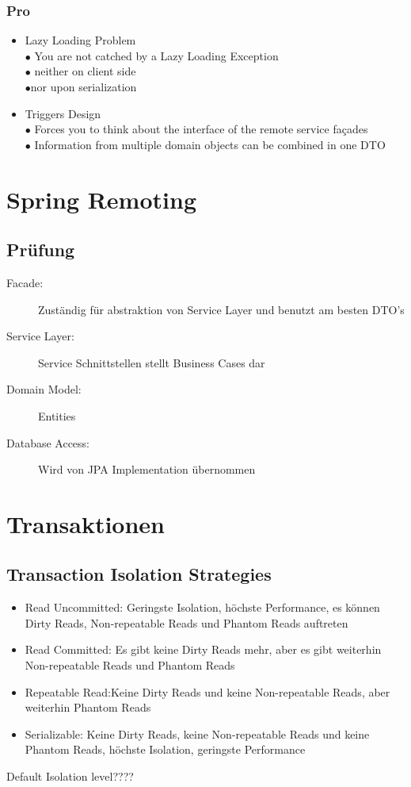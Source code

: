 \documentclass[10pt]{scrartcl}
\begin{document}
\subsubsection{Pro}
\begin{itemize}
\item Lazy Loading Problem\\
$\bullet$ You are not catched by a Lazy Loading Exception\\
\hspace*{0.5cm}$\bullet$ neither on client side\\
\hspace*{0.5cm}$\bullet$nor upon serialization
\item Triggers Design\\
$\bullet$ Forces you to think about the interface of the remote service façades\\
$\bullet$ Information from multiple domain objects can be combined in one DTO
\end{itemize}

\newpage
\section{Spring Remoting}
\subsection{Prüfung}
\begin{description}
\item[Facade:] Zuständig für abstraktion von Service Layer und benutzt am besten DTO's
\item[Service Layer:] Service Schnittstellen stellt Business Cases dar
\item[Domain Model:] Entities
\item[Database Access:] Wird von JPA Implementation übernommen
\end{description}

\newpage
\section{Transaktionen}
\subsection{Transaction Isolation Strategies}
\begin{itemize}
	\item Read Uncommitted: Geringste Isolation, höchste Performance, es können Dirty Reads, Non-repeatable Reads und Phantom Reads auftreten
	\item Read Committed: Es gibt keine Dirty Reads mehr, aber es gibt weiterhin Non-repeatable Reads und Phantom Reads
	\item Repeatable Read:Keine Dirty Reads und keine Non-repeatable Reads, aber weiterhin Phantom Reads
	\item Serializable: Keine Dirty Reads, keine Non-repeatable Reads und keine Phantom Reads, höchste Isolation, geringste Performance
\end{itemize}
Default Isolation level????
\end{document}
